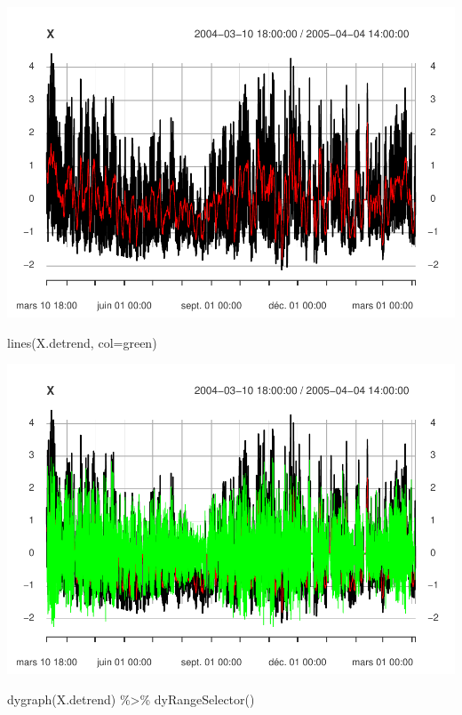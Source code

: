 \documentclass[
]{article}
\newenvironment{Shaded}{\begin{snugshade}}{\end{snugshade}}
\newcommand{\AttributeTok}[1]{\textcolor[rgb]{0.77,0.63,0.00}{#1}}
\newcommand{\FunctionTok}[1]{\textcolor[rgb]{0.00,0.00,0.00}{#1}}
\newcommand{\NormalTok}[1]{#1}
\newcommand{\SpecialCharTok}[1]{\textcolor[rgb]{0.00,0.00,0.00}{#1}}
\newcommand{\StringTok}[1]{\textcolor[rgb]{0.31,0.60,0.02}{#1}}
\begin{document}
\includegraphics{STA202_report_files/figure-latex/unnamed-chunk-12-7.pdf}

\begin{Shaded}
\begin{Highlighting}[]
\FunctionTok{lines}\NormalTok{(X.detrend, }\AttributeTok{col=}\StringTok{\textquotesingle{}green\textquotesingle{}}\NormalTok{)}
\end{Highlighting}
\end{Shaded}

\includegraphics{STA202_report_files/figure-latex/unnamed-chunk-12-8.pdf}

\begin{Shaded}
\begin{Highlighting}[]
\FunctionTok{dygraph}\NormalTok{(X.detrend) }\SpecialCharTok{\%\textgreater{}\%} \FunctionTok{dyRangeSelector}\NormalTok{()}
\end{Highlighting}
\end{Shaded}
\end{document}
